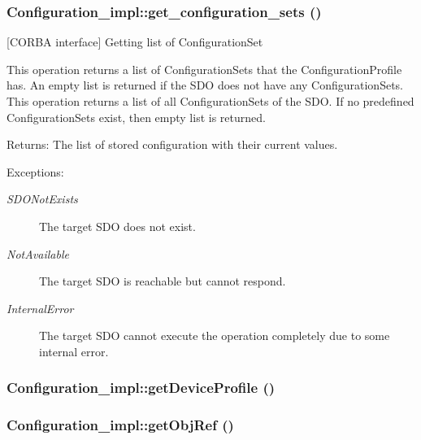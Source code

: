 \subsubsection{\setlength{\rightskip}{0pt plus 5cm}Configuration\_\-impl::get\_\-configuration\_\-sets ()}\label{classConfiguration__impl_Configuration__impla10}


[CORBA interface] Getting list of Configuration\-Set 

This operation returns a list of Configuration\-Sets that the Configuration\-Profile has. An empty list is returned if the SDO does not have any Configuration\-Sets. This operation returns a list of all Configuration\-Sets of the SDO. If no predefined Configuration\-Sets exist, then empty list is returned.

\begin{Desc}
\item[Returns:]The list of stored configuration with their current values. \end{Desc}
\begin{Desc}
\item[Exceptions:]
\begin{description}
\item[{\em SDONot\-Exists}]The target SDO does not exist. \item[{\em Not\-Available}]The target SDO is reachable but cannot respond. \item[{\em Internal\-Error}]The target SDO cannot execute the operation completely due to some internal error.\end{description}
\end{Desc}
\subsubsection{\setlength{\rightskip}{0pt plus 5cm}Configuration\_\-impl::get\-Device\-Profile ()}\label{classConfiguration__impl_Configuration__impla18}


\subsubsection{\setlength{\rightskip}{0pt plus 5cm}Configuration\_\-impl::get\-Obj\-Ref ()}\label{classConfiguration__impl_Configuration__impla17}


